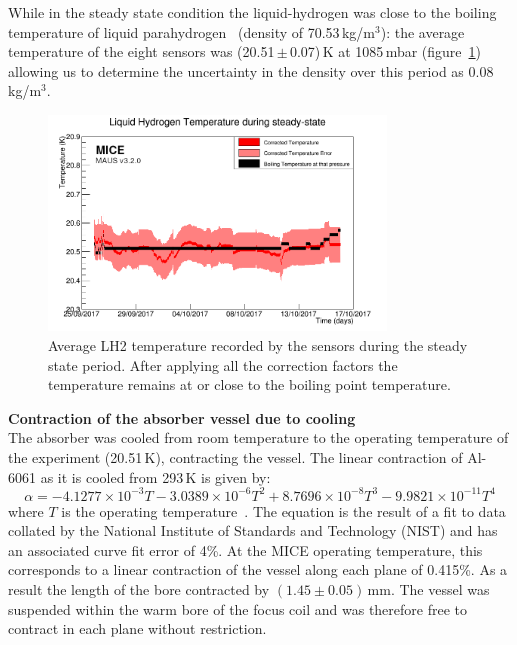 While in the steady state condition the liquid-hydrogen was close to the
boiling temperature of liquid parahydrogen~\cite{NOTE524} (density of 70.53\,kg/m$^{3}$):
the average temperature of the eight sensors was (20.51\,$\mathrm{\pm}$\,0.07)\,K at 1085\,mbar
(figure~\ref{Fig:TempCalibrated}) allowing us to determine the
uncertainty in the density over this period as 0.08\,kg/m$^{3}$. \\
\begin{figure}
  \begin{center}
    \includegraphics[width=0.80\textwidth]{SteadyState60mK_logo.png}
  \end{center}
  \caption{
    Average LH2 temperature recorded by the sensors during the
    steady state period.
    After applying all the correction factors the temperature remains
    at or close to the boiling point temperature.
  }
  \label{Fig:TempCalibrated}
\end{figure}
 

\noindent\textbf{Contraction of the absorber vessel due to cooling} \\
\noindent
The absorber was cooled from room temperature to the operating
temperature of the experiment (20.51\,K), contracting the vessel.
The linear contraction of Al-6061 as it is cooled from 293\,K is given
by: 
\begin{equation}
  \alpha =-4.1277\times {10}^{-3}T-3.0389\times {10}^{-6}T^2+8.7696\times {10}^{-8}T^3-9.9821\times {10}^{-11}T^4
\end{equation}
where $T$ is the operating temperature~\cite{Hardin}.
The equation is the result of a fit to data collated by the National
Institute of Standards and Technology (NIST) and has an associated
curve fit error of 4\%. 
At the MICE operating temperature, this corresponds to a linear
contraction of the vessel along each plane of 0.415\%.
As a result the length of the bore contracted by
$(1.45 \pm 0.05)$\,mm.
The vessel was suspended within the warm bore of the focus coil and
was therefore free to contract in each plane without restriction.  \\

